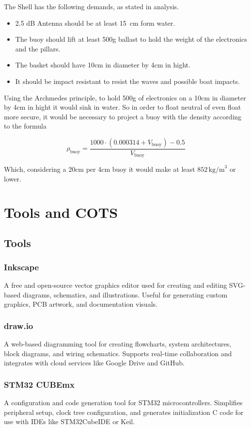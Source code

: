 The Shell has the following demands, as stated in analysis.

\begin{itemize}
    \item 2.5 dB Antenna should be at least 15 cm form water.
    \item The buoy should lift at least 500g ballast to hold the weight of the electronics and the pillars.
    \item The basket should have 10cm in diameter by 4cm in hight.
    \item It should be impact resistant to resist the waves and possible boat impacts.
\end{itemize} 

Using the Archmedes principle, to hold 500g of electronics on a 10cm in diameter by 4cm in hight it would
sink in water. So in order to float neutral of even float more secure, it would be necessary to project a 
buoy with the density according to the formula

\begin{equation}
    \rho_{\text{buoy}} = \frac{1000 \cdot (0.000314 + V_{\text{buoy}}) - 0.5}{V_{\text{buoy}}}
\end{equation}

Which, considering a 20cm per 4cm buoy it would make at least 
\(852 \, \text{kg/m}^3\) or lower.


\section{Tools and COTS}
\subsection{Tools}
\subsubsection{Inkscape}
A free and open-source vector graphics editor used for creating and editing SVG-based diagrams, schematics, and illustrations. Useful for generating custom graphics, PCB artwork, and documentation visuals.
\subsubsection{draw.io}
A web-based diagramming tool for creating flowcharts, system architectures, block diagrams, and wiring schematics. Supports real-time collaboration and integrates with cloud services like Google Drive and GitHub.
\subsubsection{STM32 CUBEmx}
A configuration and code generation tool for STM32 microcontrollers. Simplifies peripheral setup, clock tree configuration, and generates initialization C code for use with IDEs like STM32CubeIDE or Keil.
